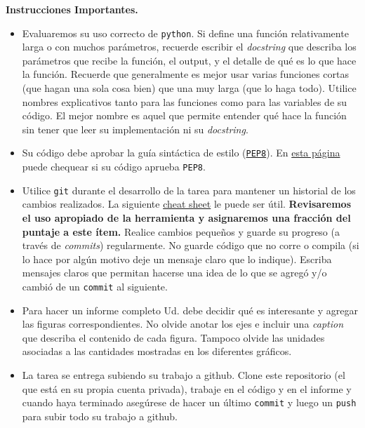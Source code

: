 \documentclass[letter, 11pt]{article}
\begin{document}
\vspace{2em}
\noindent\textbf{Instrucciones Importantes.}
\begin{itemize}

  \item Evaluaremos su uso correcto de \texttt{python}. Si define una función
    relativamente larga o con muchos parámetros, recuerde escribir el
    \emph{docstring} que describa los parámetros que recibe la función, el
    output, y el detalle de qué es lo que hace la función. Recuerde que
    generalmente es mejor usar varias funciones cortas (que hagan una sola cosa
    bien) que una muy larga (que lo haga todo).  Utilice nombres explicativos
    tanto para las funciones como para las variables de su código. El mejor
    nombre es aquel que permite entender qué hace la función sin tener que leer
    su implementación ni su \emph{docstring}.

  \item Su código debe aprobar la guía sintáctica de estilo
    (\href{https://www.python.org/dev/peps/pep-0008/}{\texttt{PEP8}}). En
    \href{http://pep8online.com}{esta página} puede chequear si su código
    aprueba \texttt{PEP8}.

  \item Utilice \texttt{git} durante el desarrollo de la tarea para mantener un
    historial de los cambios realizados. La siguiente
    \href{https://education.github.com/git-cheat-sheet-education.pdf}{cheat
      sheet} le puede ser útil. {\bf Revisaremos el uso apropiado de la
    herramienta y asignaremos una fracción del puntaje a este ítem.} Realice
    cambios pequeños y guarde su progreso (a través de \emph{commits})
    regularmente. No guarde código que no corre o compila (si lo hace por algún
    motivo deje un mensaje claro que lo indique). Escriba mensajes claros que
    permitan hacerse una idea de lo que se agregó y/o cambió de un
    \texttt{commit} al siguiente.

  \item Para hacer un informe completo Ud. debe decidir qué es interesante y
    agregar las figuras correspondientes. No olvide anotar los ejes e incluir
    una \emph{caption} que describa el contenido de cada figura. Tampoco olvide
    las unidades asociadas a las cantidades mostradas en los diferentes
    gráficos.

  \item La tarea se entrega subiendo su trabajo a github. Clone este
    repositorio (el que está en su propia cuenta privada), trabaje en el código
    y en el informe y cuando haya terminado asegúrese de hacer un último
    \texttt{commit} y luego un \texttt{push} para subir todo su trabajo a
    github.


\end{itemize}
\end{document}
